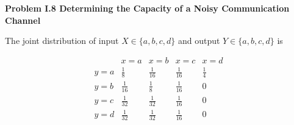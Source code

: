\documentclass[11pt]{article}
\newcommand{\problem}[1]{%
    \vspace{1em}
    {\large\bfseries #1}
    \par
    \vspace{0.4em}
}
\begin{document}

\problem{Problem I.8 Determining the Capacity of a Noisy Communication Channel}

The joint distribution of input \(X\in\{a,b,c,d\}\) and output
\(Y\in\{a,b,c,d\}\) is

\[
\begin{array}{c|cccc}
    & x=a & x=b & x=c & x=d \\
    \hline
    y=a & \frac18  & \frac1{16} & \frac1{16} & \frac14 \\
    y=b & \frac1{16} & \frac18  & \frac1{16} & 0 \\
    y=c & \frac1{32} & \frac1{32} & \frac1{16} & 0 \\
    y=d & \frac1{32} & \frac1{32} & \frac1{16} & 0
\end{array}
\]
\end{document}
